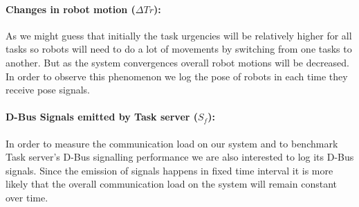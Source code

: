\documentclass{llncs}
\begin{document}
\paragraph*{Changes in robot motion ($\Delta Tr$): }
As we might guess that initially the task urgencies will be relatively higher for all tasks so robots will need to do a lot of movements by switching from one tasks to another. But as the system convergences overall robot motions will be decreased. In order to observe this phenomenon we log the pose of robots in each time they receive pose signals.
%
\paragraph*{D-Bus Signals emitted by Task server ($S_f$): }
In order to measure the communication load on our system and to benchmark Task server's D-Bus signalling performance we are also interested to log its D-Bus signals. Since the emission of signals happens in fixed time interval it is more likely that the overall communication load on the system will remain constant over time.
%
% 
\end{document}
